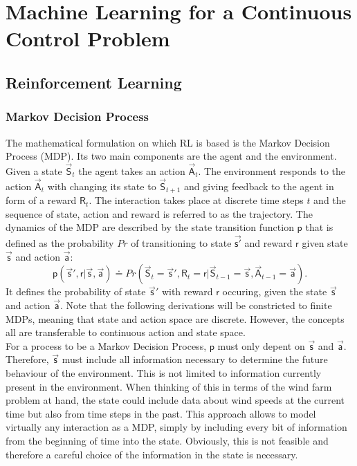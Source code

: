 \section{Machine Learning for a Continuous Control Problem}
\subsection{Reinforcement Learning}
\subsubsection{Markov Decision Process}
The mathematical formulation on which RL is based is the Markov Decision Process (MDP). Its two main components are the agent and the environment. Given a state $\vec{\mathsf{S}}_t$ the agent takes an action $\vec{\mathsf{A}}_t$. The environment responds to the action $\vec{\mathsf{A}}_t$ with changing its state to $\vec{\mathsf{S}}_{t+1}$ and giving feedback to the agent in form of a reward $\mathsf{R}_t$. The interaction takes place at discrete time steps $t$ and the sequence of state, action and reward is referred to as the trajectory. The dynamics of the MDP are described by the state transition function $\mathsf{p}$ that is defined as the probability $Pr$ of transitioning to state $\vec{\mathsf{s'}}$ and reward $\mathsf{r}$ given state $\vec{\mathsf{s}}$ and action $\vec{\mathsf{a}}$:
\begin{equation}
\mathsf{p}(\vec{\mathsf{s}}',\mathsf{r} \vert \vec{\mathsf{s}},\vec{\mathsf{a}}) \doteq Pr(\vec{\mathsf{S}}_t=\vec{\mathsf{s}}', \mathsf{R}_t=\mathsf{r} \vert \vec{\mathsf{S}}_{t-1} = \vec{\mathsf{s}}, \vec{\mathsf{A}}_{t-1} = \vec{\mathsf{a}}). \label{eq:prob_func}
\end{equation}
It defines the probability of state $\vec{\mathsf{s}}'$ with reward $\mathsf{r}$ occuring, given the state $\vec{\mathsf{s}}$ and action $\vec{\mathsf{a}}$. Note that the following derivations will be constricted to finite MDPs, meaning that state and action space are discrete. However, the concepts all are transferable to continuous action and state space. \\
For a process to be a Markov Decision Process, $\mathsf{p}$ must only depent on $\vec{\mathsf{s}}$ and $\vec{\mathsf{a}}$. Therefore, $\vec{\mathsf{s}}$ must include all information necessary to determine the future behaviour of the environment. This is not limited to information currently present in the environment. When thinking of this in terms of the wind farm problem at hand, the state could include data about wind speeds at the current time but also from time steps in the past. This approach allows to model virtually any interaction as a MDP, simply by including every bit of information from the beginning of time into the state. Obviously, this is not feasible and therefore a careful choice of the information in the state is necessary. \\
